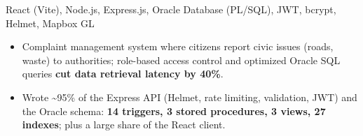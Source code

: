 {}
{React (Vite), Node.js, Express.js, Oracle Database (PL/SQL), JWT, bcrypt, Helmet, Mapbox GL}
{\begin{itemize}
  \item Complaint management system where citizens report civic issues (roads, waste) to authorities; role-based access control and optimized Oracle SQL queries \textbf{cut data retrieval latency by 40\%}.
  \item Wrote \textasciitilde95\% of the Express API (Helmet, rate limiting, validation, JWT) and the Oracle schema: \textbf{14 triggers, 3 stored procedures, 3 views, 27 indexes}; plus a large share of the React client.
\end{itemize}}
